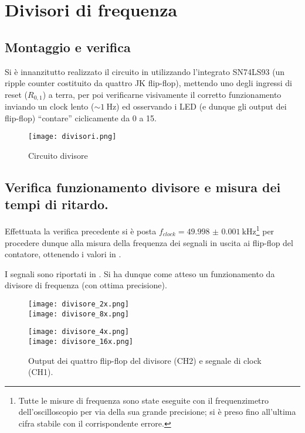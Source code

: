\section{Divisori di frequenza}
\subsection{Montaggio e verifica}
Si è innanzitutto realizzato il circuito in  utilizzando l'integrato SN74LS93 (un ripple counter costituito da quattro JK flip-flop), mettendo uno degli ingressi di reset ($R_{0,1}$) a terra, per poi verificarne visivamente il corretto funzionamento inviando un clock lento ($\sim \SI{1}{\Hz}$) ed osservando i LED (e dunque gli output dei flip-flop) ``contare'' ciclicamente da 0 a 15.

\begin{figure}[h]
	\centering
	\texttt{[image: divisori.png]}
	\caption{Circuito divisore}
	\label{fig:div}
\end{figure}

\subsection{Verifica funzionamento divisore e misura dei tempi di ritardo.}
Effettuata la verifica precedente si è posta $f_{clock} = \SI{49.998(1)}{ \kilo \hertz}$\footnote{\label{fn:frmeas}Tutte le misure di frequenza sono state eseguite con il frequenzimetro dell'oscilloscopio per via della sua grande precisione; si è preso fino all'ultima cifra stabile con il corrispondente errore.} per procedere dunque alla misura della frequenza dei segnali in uscita ai flip-flop del contatore, ottenendo i valori in .

I segnali sono riportati in . Si ha dunque come atteso un funzionamento da divisore di frequenza (con ottima precisione).

\begin{figure}[h]
	\centering
	\begin{minipage}{0.47\textwidth}
		\texttt{[image: divisore\_2x.png]}
		\\
		\texttt{[image: divisore\_8x.png]}
	\end{minipage}
	\begin{minipage}{0.47\textwidth}
		\texttt{[image: divisore\_4x.png]}
		\\
		\texttt{[image: divisore\_16x.png]}
	\end{minipage}
	\caption{Output dei quattro flip-flop del divisore (CH2) e segnale di clock (CH1).}
	\label{fig:divout}
\end{figure}

